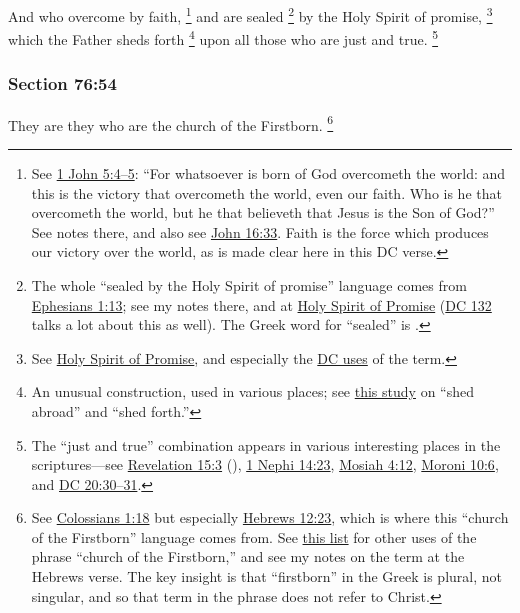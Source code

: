 		And who overcome by faith,%
			\footnote{%
				See \hyperref[1JOHN-5-4]{1 John 5:4--5}: ``For whatsoever is born of God overcometh the world: and this is the victory that overcometh the world, even our faith. Who is he that overcometh the world, but he that believeth that Jesus is the Son of God?'' See notes there, and also see \hyperref[JOHN-16-33]{John 16:33}. Faith is the force which produces our victory over the world, as is made clear here in this DC verse.
				}
		and are sealed%
			\footnote{%
				The whole ``sealed by the Holy Spirit of promise'' language comes from \hyperref[EPHESIANS-1-13]{Ephesians 1:13}; see my notes there, and at \hyperref[HSOP]{Holy Spirit of Promise} (\hyperref[DC132]{DC 132} talks a lot about this as well). The Greek word for ``sealed'' is \hyperref[SPHRAGIZO]{}.
				}
		by the Holy Spirit of promise,%
			\footnote{%
				See \hyperref[HSOP]{Holy Spirit of Promise}, and especially the \hyperref[HSOP-DC]{DC uses} of the term.
				}
		which the Father sheds forth%
			\footnote{%
				An unusual construction, used in various places; see \hyperref[SHED-abroad]{this study} on ``shed abroad'' and ``shed forth.''
				}
		upon all those who are just and true.%
			\footnote{%
				The ``just and true'' combination appears in various interesting places in the scriptures---see \hyperref[REVELATIONNT-15-3]{Revelation 15:3} (), \hyperref[1NEPHI-14-23]{1 Nephi 14:23}, \hyperref[MOSIAH-4-12]{Mosiah 4:12}, \hyperref[MORONI-10-6]{Moroni 10:6}, and \hyperref[DC20-30]{DC 20:30--31}.
				}


	\subsubsection{Section 76:54} %
		\label{DC76-54}

		They are they who are the church of the Firstborn.%
			\footnote{%
				See \hyperref[COLOSSIANS-1-18]{Colossians 1:18} but especially \hyperref[HEBREWS-12-23]{Hebrews 12:23}, which is where this ``church of the Firstborn'' language comes from. See \hyperref[CHURCH-PHRASES]{this list} for other uses of the phrase ``church of the Firstborn,'' and see my notes on the term at the Hebrews verse. The key insight is that ``firstborn'' in the Greek is plural, not singular, and so that term in the phrase does not refer to Christ.
				}

